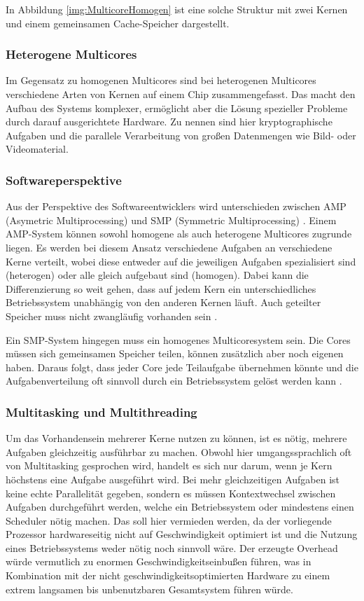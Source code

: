 \documentclass[11pt,a4paper,titlepage]{article}
\begin{document}
In Abbildung \ref{img:MulticoreHomogen} ist eine solche Struktur mit zwei Kernen und einem gemeinsamen Cache-Speicher dargestellt.

\subsubsection{Heterogene Multicores}

Im Gegensatz zu homogenen Multicores sind bei heterogenen Multicores verschiedene Arten von Kernen auf einem Chip zusammengefasst. Das macht den Aufbau des Systems komplexer, ermöglicht aber die Lösung spezieller Probleme durch darauf ausgerichtete Hardware. Zu nennen sind hier kryptographische Aufgaben \cite{Roloff} und die parallele Verarbeitung von großen Datenmengen wie Bild- oder Videomaterial. 

\subsubsection{Softwareperspektive}

Aus der Perspektive des Softwareentwicklers wird unterschieden zwischen AMP (Asymetric Multiprocessing) und SMP (Symmetric Multiprocessing) \cite{Walls}. Einem AMP-System können sowohl homogene als auch heterogene Multicores zugrunde liegen. Es werden bei diesem Ansatz verschiedene Aufgaben an verschiedene Kerne verteilt, wobei diese entweder auf die jeweiligen Aufgaben spezialisiert sind (heterogen) oder alle gleich aufgebaut sind (homogen). Dabei kann die Differenzierung so weit gehen, dass auf jedem Kern ein unterschiedliches Betriebssystem unabhängig von den anderen Kernen läuft. Auch geteilter Speicher muss nicht zwangläufig vorhanden sein \cite{Walls}. 

Ein SMP-System hingegen muss ein homogenes Multicoresystem sein. Die Cores müssen sich gemeinsamen Speicher teilen, können zusätzlich aber noch eigenen haben. Daraus folgt, dass jeder Core jede Teilaufgabe übernehmen könnte und die Aufgabenverteilung oft sinnvoll durch ein Betriebssystem gelöst werden kann \cite{Walls}.

\subsubsection{Multitasking und Multithreading}

Um das Vorhandensein mehrerer Kerne nutzen zu können, ist es nötig, mehrere Aufgaben gleichzeitig ausführbar zu machen. Obwohl hier umgangssprachlich oft von Multitasking gesprochen wird, handelt es sich nur darum, wenn je Kern höchstens eine Aufgabe ausgeführt wird. Bei mehr gleichzeitigen Aufgaben ist keine echte Parallelität gegeben, sondern es müssen Kontextwechsel zwischen Aufgaben durchgeführt werden, welche ein Betriebssystem oder mindestens einen Scheduler nötig machen. Das soll hier vermieden werden, da der vorliegende Prozessor hardwareseitig nicht auf Geschwindigkeit optimiert ist \cite{Boehme} und die Nutzung eines Betriebssystems weder nötig noch sinnvoll wäre. Der erzeugte Overhead würde vermutlich zu enormen Geschwindigkeitseinbußen führen, was in Kombination mit der nicht geschwindigkeitsoptimierten Hardware zu einem extrem langsamen bis unbenutzbaren Gesamtsystem führen würde.
\end{document}
